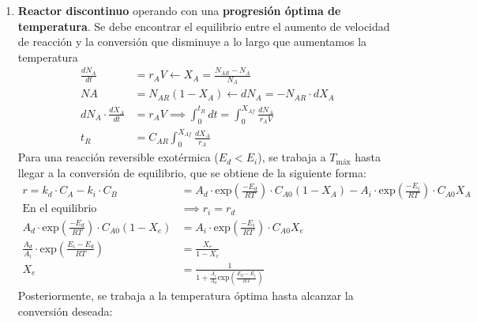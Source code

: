 \begin{enumerate}[label=\Roman*.]
\begin{align*}
		      \right.
	      \end{align*}
	      \newpage
	\item \textbf{Reactor discontinuo} operando con una \textbf{progresión óptima de temperatura}. Se debe encontrar el equilibrio entre el aumento de velocidad de reacción y la conversión que disminuye a lo largo que aumentamos la temperatura
	      \begin{align*}
		      \frac{dN_A}{dt}            & = r_A V \leftarrow  X_A = \frac{N_{AR}-N_A}{N_{A}}                    \\[6pt]
		      NA                         & = N_{AR}(1-X_A) \leftarrow dN_A = -N_{AR}\cdot dX_A                   \\[6pt]
		      dN_A \cdot \frac{dX_A}{dt} & = r_A V \implies \int_0^{t_R} dt = \int_0^{X_{Af}} \frac{dN_A}{r_A V} \\[6pt]
		      t_R                        & = C_{AR}\int_0^{X_{Af}} \frac{dX_A}{r_A}
	      \end{align*}
	      Para una reacción reversible exotérmica ($E_d < E_i$), se trabaja a $T_{\text{máx}}$ hasta llegar a la conversión de equilibrio, que se obtiene de la siguiente forma:
	      \begin{align*}
		      r = k_d \cdot C_A - k_i \cdot C_B                                    & = A_d \cdot \text{exp}\left(\frac{-E_d}{RT}\right) \cdot C_{A0}(1-X_A) - A_i \cdot \text{exp}\left(\frac{-E_i}{RT}\right) \cdot C_{A0}X_A \\[6pt]
		      \text{En el equilibrio}                                              & \implies r_i = r_d                                                                                                                        \\[6pt]
		      A_d \cdot \text{exp}\left(\frac{-E_d}{RT}\right) \cdot C_{A0}(1-X_e) & = A_i \cdot \text{exp}\left(\frac{-E_i}{RT}\right) \cdot C_{A0}X_e                                                                        \\[6pt]
		      \frac{A_d}{A_i} \cdot \text{exp}\left(\frac{E_i-E_d}{RT}\right)      & = \frac{X_e}{1-X_e}                                                                                                                       \\[6pt]
		      X_e                                                                  & = \frac{1}{1 + \frac{A_i}{A_d} \text{exp}\left(\frac{E_d-E_i}{RT}\right)}
	      \end{align*}
	      Posteriormente, se trabaja a la temperatura óptima hasta alcanzar la conversión deseada:

\end{enumerate}
